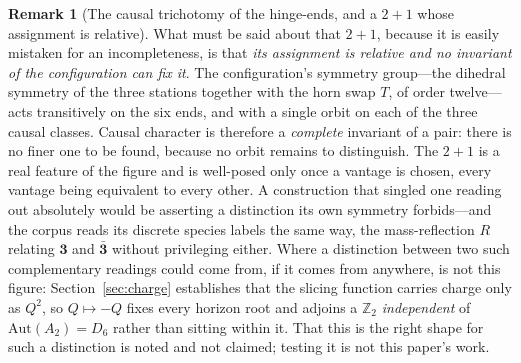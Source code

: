 \documentclass[11pt,a4paper]{article}
\theoremstyle{definition}
\newtheorem{remark}[theorem]{Remark}
\begin{document}
\begin{remark}[The causal trichotomy of the hinge-ends, and a $2{+}1$ whose assignment is relative]
What must be said about that $2{+}1$, because it is easily mistaken for an incompleteness, is that \emph{its assignment is relative and no invariant of the configuration can fix it}. The configuration's symmetry group---the dihedral symmetry of the three stations together with the horn swap $T$, of order twelve---acts transitively on the six ends, and with a single orbit on each of the three causal classes. Causal character is therefore a \emph{complete} invariant of a pair: there is no finer one to be found, because no orbit remains to distinguish. The $2{+}1$ is a real feature of the figure and is well-posed only once a vantage is chosen, every vantage being equivalent to every other. A construction that singled one reading out absolutely would be asserting a distinction its own symmetry forbids---and the corpus reads its discrete species labels the same way, the mass-reflection $R$ relating $\mathbf3$ and $\bar{\mathbf3}$ without privileging either. Where a distinction between two such complementary readings could come from, if it comes from anywhere, is not this figure: Section~\ref{sec:charge} establishes that the slicing function carries charge only as $Q^{2}$, so $Q\mapsto-Q$ fixes every horizon root and adjoins a $\mathbb{Z}_{2}$ \emph{independent} of $\mathrm{Aut}(A_{2})=D_{6}$ rather than sitting within it. That this is the right shape for such a distinction is noted and not claimed; testing it is not this paper's work.
\end{remark}
\end{document}
